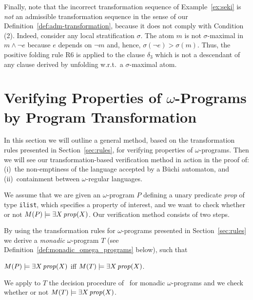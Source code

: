 \documentclass[english]{tlp}
\begin{document}
Finally, note that the incorrect transformation sequence of
Example~\ref{ex:seki} is {\it{not}} an admissible transformation
sequence in the sense of our
Definition~\ref{def:adm-transformation}, because it does not comply
with Condition (2). Indeed, consider any local stratification $\sigma$.
The atom $m$ is not $\sigma$-maximal in $m \wedge \neg
e$ because $e$ depends  on $\neg m$ and, hence,
$\sigma(\neg e)\!>\!\sigma(m)$. Thus, the positive folding rule R6 is
applied to the clause $\delta_3$ which is not a descendant of any
clause derived by unfolding w.r.t.~a $\sigma$-maximal atom.

\section{Verifying Properties of $\omega$-Programs by
Program Transformation}
\label{sec:verification}

In this section we will outline a general method, based on the
transformation rules presented in Section~\ref{sec:rules},
for verifying properties of $\omega$-programs.
Then we will see our transformation-based
verification method in action in the proof of: (i)~the
non-emptiness of the language accepted by a B\"{u}chi automaton, 
and (ii)~containment between $\omega$-regular languages.

We assume that we are given an $\omega$-program $P$ 
defining a unary predicate {\it prop} of type {\tt ilist},
which specifies a property of interest,
and we want to check whether or not $M(P)\models\exists X\, {\it prop}(X)$.
Our verification method consists of two steps. 

\smallskip

By using the transformation rules for  $\omega$-programs presented in 
Section~\ref{sec:rules} we derive a {\em monadic} $\omega$-program $T$
(see Definition~\ref{def:monadic_omega_programs} below), such that

$M(P)\models\exists X\, {\it prop}(X)$ iff $M(T)\models\exists X\, {\it prop}(X)$.

\smallskip

We apply to $T$ the decision procedure of~\cite{Pe&09b} for
monadic $\omega$-programs and we check whether or not 
$M(T)\models\exists X\, {\it prop}(X)$.

\smallskip
\end{document}
